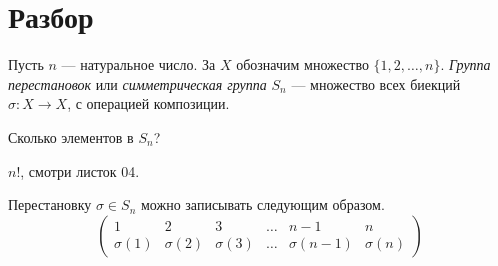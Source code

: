 \documentclass[a4paper,12pt]{article}
\begin{document}
    
    \section{Разбор}
    
     Пусть $n$ --- натуральное число. За $X$ обозначим множество $\{1,2,\ldots,n\}$. \emph{Группа перестановок} или \emph{симметрическая группа} $S_n$ --- множество всех биекций $\sigma \colon X \to X$, с операцией композиции.
    
    \problem Сколько элементов в $S_n$?
    \begin{solution}
        $n!$, смотри листок 04.
    \end{solution}
    
    Перестановку $\sigma \in S_n$ можно записывать следующим образом.\\
    \begin{equation*}
        \begin{pmatrix}
            1 & 2 & 3 & \ldots & n-1 & n \\
            \sigma(1) & \sigma(2) & \sigma(3) & \ldots & \sigma(n-1) & \sigma(n)
        \end{pmatrix}
    \end{equation*}
    
\end{document}
